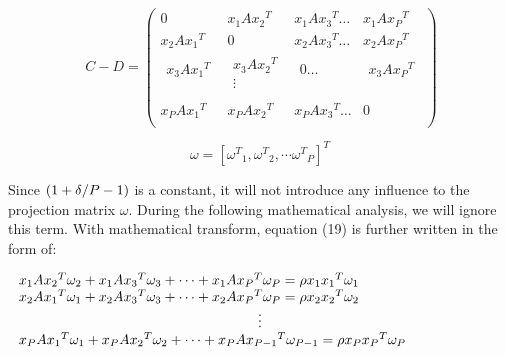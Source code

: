 \documentclass[journal]{IEEEtran}
\begin{document}
\begin{small}
\begin{equation}
\:C - D = \left( {\begin{array}{*{20}{c}}
   0 & {{x_1}A{x_2}^T} & {{x_1}A{x_3}^T \ldots } & {{x_1}A{x_P}^T}  \\
   {{x_2}A{x_1}^T} & 0 & {{x_2}A{x_3}^T \ldots } & {{x_2}A{x_P}^T}  \\
   {\begin{array}{*{20}{c}}
   {{x_3}A{x_1}^T}  \\
   {}  \\
\end{array}} & {\begin{array}{*{20}{c}}
   {{x_3}A{x_2}^T}  \\
    \vdots   \\
\end{array}} & {\begin{array}{*{20}{c}}
   {0 \ldots }  \\
   {}  \\
\end{array}} & {\begin{array}{*{20}{c}}
   {{x_3}A{x_P}^T}  \\
   {}  \\
\end{array}}  \\
   {{x_P}A{x_1}^T} & {{x_P}A{x_2}^T} & {{x_P}A{x_3}^T \ldots } & 0  \\
\end{array}} \right)
\end{equation}
\end{small}
\begin{small}\begin{equation} \omega  = [{\omega ^T}_1,{\omega ^T}_2, \cdots {\omega ^T}_P]^T \end{equation}\end{small}
Since $({{1 + \delta } \mathord{\left/
 {\vphantom {{1 + \delta } {P - 1}}} \right.
 \kern-\nulldelimiterspace} {P - 1}})$ is a constant, it will not introduce any influence to the projection matrix $\omega$. During the following mathematical analysis, we will ignore this term. With mathematical transform, equation (19) is further written in the form of:
\begin{small}
\begin{equation}
\begin{array}{l}
{x_1}A{x_2}^T{\omega _2} + {x_1}A{x_3}^T{\omega _3} +  \cdots  + {x_1}A{x_P}^T{\omega _P} = {\rho}{x_1}{x_1}^T{\omega _1}\\
{x_2}A{x_1}^T{\omega _1} + {x_2}A{x_3}^T{\omega _3} +  \cdots  + {x_2}A{x_P}^T{\omega _P} = {\rho}{x_2}{x_2}^T{\omega _2}\\
                \centerline \vdots \\
{x_P}A{x_1}^T{\omega _1} + {x_P}A{x_2}^T{\omega _2} +  \cdots  + {x_P}A{x_{P - 1}}^T{\omega _{P - 1}} = {\rho}{x_P}{x_P}^T{\omega _P}
\end{array}
\end{equation}
\end{small}\\\indent
\end{document}
